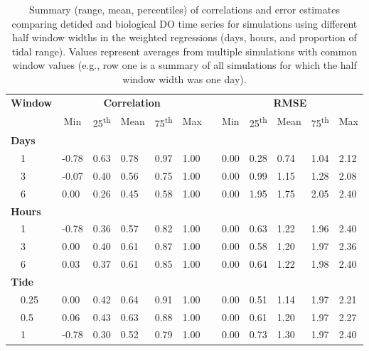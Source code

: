 \documentclass[letterpaper,12pt,oneside]{article}\usepackage[]{graphicx}\usepackage[]{color}
\begin{document}
%
\begin{table}[!tbp]
\caption{Summary (range, mean, percentiles) of correlations and error estimates comparing detided and biological \ac{DO} time series for simulations using different half window widths in the weighted regressions (days, hours, and proportion of tidal range).  Values represent averages from multiple simulations with common window values (e.g., row one is a summary of all simulations for which the half window width was one day).\label{tab:dtd_perf2}} 
\begin{center}
\begin{tabular}{llllllclllll}
\hline\hline
\multicolumn{1}{l}{\bfseries Window}&\multicolumn{5}{c}{\bfseries Correlation}&\multicolumn{1}{c}{\bfseries }&\multicolumn{5}{c}{\bfseries RMSE}\tabularnewline
\cline{2-6} \cline{8-12}
\multicolumn{1}{l}{}&\multicolumn{1}{c}{Min}&\multicolumn{1}{c}{25\textsuperscript{th}}&\multicolumn{1}{c}{Mean}&\multicolumn{1}{c}{75\textsuperscript{th}}&\multicolumn{1}{c}{Max}&\multicolumn{1}{c}{}&\multicolumn{1}{c}{Min}&\multicolumn{1}{c}{25\textsuperscript{th}}&\multicolumn{1}{c}{Mean}&\multicolumn{1}{c}{75\textsuperscript{th}}&\multicolumn{1}{c}{Max}\tabularnewline
\hline
{\bfseries Days}&&&&&&&&&&&\tabularnewline
~~1&-0.78&0.63&0.78&0.97&1.00&&0.00&0.28&0.74&1.04&2.12\tabularnewline
~~3&-0.07&0.40&0.56&0.75&1.00&&0.00&0.99&1.15&1.28&2.08\tabularnewline
~~6& 0.00&0.26&0.45&0.58&1.00&&0.00&1.95&1.75&2.05&2.40\tabularnewline
\hline
{\bfseries Hours}&&&&&&&&&&&\tabularnewline
~~1&-0.78&0.36&0.57&0.82&1.00&&0.00&0.63&1.22&1.96&2.40\tabularnewline
~~3& 0.00&0.40&0.61&0.87&1.00&&0.00&0.58&1.20&1.97&2.36\tabularnewline
~~6& 0.03&0.37&0.61&0.85&1.00&&0.00&0.64&1.22&1.98&2.40\tabularnewline
\hline
{\bfseries Tide}&&&&&&&&&&&\tabularnewline
~~0.25& 0.00&0.42&0.64&0.91&1.00&&0.00&0.51&1.14&1.97&2.21\tabularnewline
~~0.5& 0.06&0.43&0.63&0.88&1.00&&0.00&0.61&1.20&1.97&2.27\tabularnewline
~~1&-0.78&0.30&0.52&0.79&1.00&&0.00&0.73&1.30&1.97&2.40\tabularnewline
\hline
\end{tabular}
\end{center}
\end{table}
\end{document}
